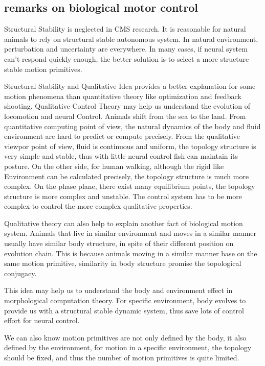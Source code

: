 \subsection{remarks on biological motor control}
Structural Stability is neglected in CMS research.
It is reasonable for natural animals to rely on structural stable autonomous system. 
In natural environment, perturbation and uncertainty are everywhere. In many cases, if neural system
can’t respond quickly enough, the better solution is to select a more structure stable motion primitives.

Structural Stability and Qualitative Idea provides a better explanation for some motion phenomena than quantitative theory like optimization and feedback shooting.
Qualitative Control Theory may help us understand the evolution of locomotion and neural Control.
Animals shift from the sea to the land. From quantitative computing point of view, the natural dynamics of the body and fluid environment are hard to predict or compute precisely. From the qualitative viewpor point of view, fluid is continuous
and uniform, the topology structure is very simple and stable, thus with little neural control fish can maintain its posture. On the other side, for human walking, although the rigid like
Environment can be calculated precisely, the topology structure is much more complex. 
On the phase plane, there exist many equilibrium points, the topology structure is more complex and unstable. 
The control system has to be more complex to control the more complex qualitative properties.

Qualitative theory can also help to explain another fact of biological motion system. 
Animals that live in similar environment and moves in a similar manner usually have similar body structure, in spite of their different position on evolution chain. 
This is because animals moving in a similar manner base on the same motion primitive, similarity in body structure promise the topological conjugacy.

This idea may help us to understand the body and environment effect in morphological computation theory. 
For specific environment, body evolves to provide us with a structural stable dynamic system, thus save lots of control effort for neural control.

We can also know motion primitives are not only defined by the body, it also defined by the environment, for motion in a specific environment, the topology should be fixed, and thus the number of motion primitives is quite limited.


